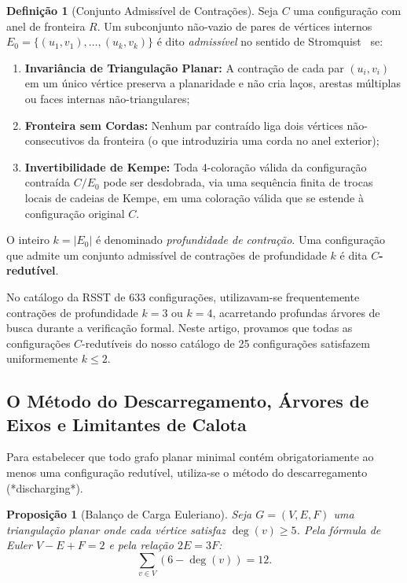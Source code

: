 \documentclass[11pt,a4paper]{article}
\theoremstyle{plain}
\newtheorem{proposition}[theorem]{Proposição}
\theoremstyle{definition}
\newtheorem{definition}[theorem]{Definição}
\begin{document}
\begin{definition}[Conjunto Admissível de Contrações]
Seja $C$ uma configuração com anel de fronteira $R$. Um subconjunto não-vazio de pares de vértices internos $E_0 = \{(u_1, v_1), \dots, (u_k, v_k)\}$ é dito \emph{admissível} no sentido de Stromquist~\cite{stromquist1975some} se:
\begin{enumerate}
    \item \textbf{Invariância de Triangulação Planar:} A contração de cada par $(u_i, v_i)$ em um único vértice preserva a planaridade e não cria laços, arestas múltiplas ou faces internas não-triangulares;
    \item \textbf{Fronteira sem Cordas:} Nenhum par contraído liga dois vértices não-consecutivos da fronteira (o que introduziria uma corda no anel exterior);
    \item \textbf{Invertibilidade de Kempe:} Toda 4-coloração válida da configuração contraída $C / E_0$ pode ser desdobrada, via uma sequência finita de trocas locais de cadeias de Kempe, em uma coloração válida que se estende à configuração original $C$.
\end{enumerate}
O inteiro $k = |E_0|$ é denominado \emph{profundidade de contração}. Uma configuração que admite um conjunto admissível de contrações de profundidade $k$ é dita \textbf{$C$-redutível}.
\end{definition}

No catálogo da RSST de 633 configurações, utilizavam-se frequentemente contrações de profundidade $k=3$ ou $k=4$, acarretando profundas árvores de busca durante a verificação formal. Neste artigo, provamos que todas as configurações $C$-redutíveis do nosso catálogo de 25 configurações satisfazem uniformemente $k \le 2$.

\subsection{O Método do Descarregamento, Árvores de Eixos e Limitantes de Calota}

Para estabelecer que todo grafo planar minimal contém obrigatoriamente ao menos uma configuração redutível, utiliza-se o método do descarregamento (*discharging*).

\begin{proposition}[Balanço de Carga Euleriano]
Seja $G = (V, E, F)$ uma triangulação planar onde cada vértice satisfaz $\deg(v) \ge 5$. Pela fórmula de Euler $V - E + F = 2$ e pela relação $2E = 3F$:
\begin{equation}
\sum_{v \in V} (6 - \deg(v)) = 12.
\end{equation}
\end{proposition}
\end{document}
